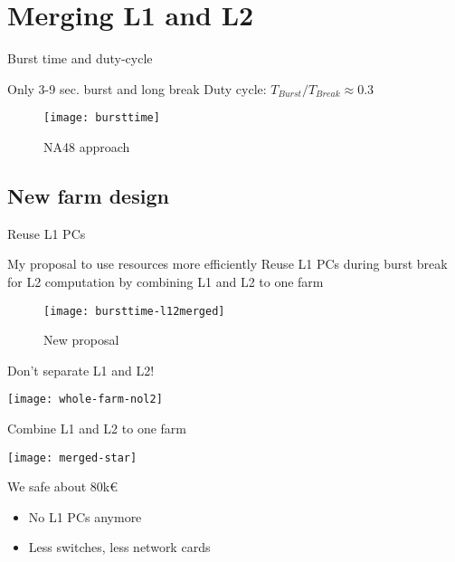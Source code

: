 \section{Merging L1 and L2}

\begin{frame}{Burst time and duty-cycle}{}
	\begin{block}{Only 3-9 sec. burst and long break}
		Duty cycle: $T_{Burst}/ T_{Break} \approx 0.3$
	\end{block}

	\vspace{1cm}
	\begin{figure}[htp]
		\begin{center}
		  \texttt{[image: bursttime]}
		  \caption{NA48 approach}
		\end{center}
	\end{figure}
\end{frame}

\subsection{New farm design}
\begin{frame}{Reuse L1 PCs}{}
	\begin{block}{My proposal to use resources more efficiently}
		Reuse L1 PCs during burst break for L2 computation by combining L1 and L2 to
		one farm
	\end{block}

	\vspace{1cm}
	\begin{figure}[htp]
		\begin{center}
		 \texttt{[image: bursttime-l12merged]}
		  \caption{New proposal}
		\end{center}
	\end{figure}
\end{frame}

\begin{frame}{Don't separate L1 and L2!}{}
	\begin{center} 
		\texttt{[image: whole-farm-nol2]}
	\end{center} 
\end{frame}

\begin{frame}{Combine L1 and L2 to one farm}{}
	\begin{center} 
		\texttt{[image: merged-star]}
	\end{center} 
	\begin{exampleblock}{We safe about 80k€}
		\begin{itemize}
		  \item No L1 PCs anymore
		  \item Less switches, less network cards
		\end{itemize}
	\end{exampleblock}
\end{frame}

